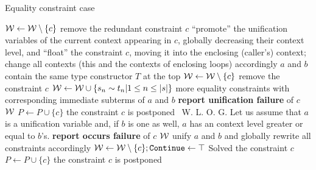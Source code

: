 \begin{algorithm}
    \caption{Equality constraint case}
    \label{case_equality}
    \begin{algorithmic}
        \State $\mathcal W \gets \mathcal W \setminus \{c\}$ \Comment remove the redundant constraint $c$
            \State ``promote'' the unification variables of the current context appearing in $c$, globally decreasing their context level, and ``float'' the constraint $c$, moving it into the enclosing (caller's) context; change all contexts (this and the contexts of enclosing loops) accordingly
             \Comment $a$ and $b$ contain the same type constructor $T$ at the top
                \State $\mathcal W \gets \mathcal W \setminus \{c\}$ \Comment remove the constraint $c$
                \State $\mathcal W \gets \mathcal W \cup \{s_n \sim t_n | 1 \leq n \leq |s|\}$ \Comment more equality constraints with corresponding immediate subterms of $a$ and $b$
             
                \State \textbf{report unification failure} of $c$
                \State \Return $\mathcal W$
            \Else {}
            \State $P \gets P \cup \{c\}$ \Comment the constraint $c$ is postponed
            \EndIf
        \Else
            \ {W. L. O. G. Let us assume that $a$ is a unification variable and, if $b$ is one as well, $a$ has an context level greater or equal to $b$'s.}
                \State \textbf{report occurs failure} of $c$
                \State \Return $\mathcal W$
                \State unify $a$ and $b$ and globally rewrite all constraints accordingly
                \State $\mathcal W \gets \mathcal W \setminus \{c\}; \mathtt{Continue} \gets \top$ \Comment Solved the constraint $c$
            \Else
                \State $P \gets P \cup \{c\}$ \Comment the constraint $c$ is postponed
            \EndIf
        \EndIf
    \end{algorithmic}
\end{algorithm}

